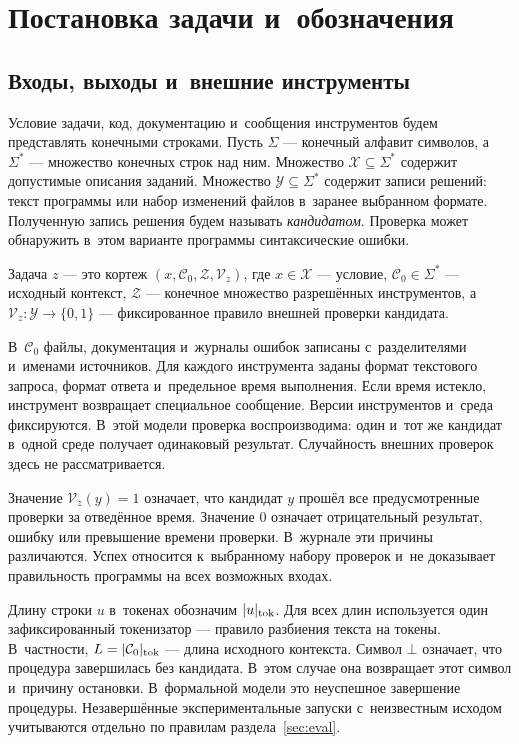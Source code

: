 \section{Постановка задачи и~обозначения}\label{sec:problem}
\subsection{Входы, выходы и~внешние инструменты}
Условие задачи, код, документацию и~сообщения инструментов будем представлять конечными строками. Пусть $\Sigma$ --- конечный алфавит символов, а~$\Sigma^*$ --- множество конечных строк над ним. Множество $\mathcal{X}\subseteq\Sigma^*$ содержит допустимые описания заданий. Множество $\mathcal{Y}\subseteq\Sigma^*$ содержит записи решений: текст программы или набор изменений файлов в~заранее выбранном формате. Полученную запись решения будем называть \emph{кандидатом}. Проверка может обнаружить в~этом варианте программы синтаксические ошибки.

\begin{definition}
Задача $z$ --- это кортеж $(x,\mathcal{C}_0,\mathcal{Z},\mathcal{V}_z)$, где $x\in\mathcal{X}$ --- условие, $\mathcal{C}_0\in\Sigma^*$ --- исходный контекст, $\mathcal{Z}$ --- конечное множество разрешённых инструментов, а~$\mathcal{V}_z:\mathcal{Y}\to\{0,1\}$ --- фиксированное правило внешней проверки кандидата.
\end{definition}

В~$\mathcal{C}_0$ файлы, документация и~журналы ошибок записаны с~разделителями и~именами источников. Для каждого инструмента заданы формат текстового запроса, формат ответа и~предельное время выполнения. Если время истекло, инструмент возвращает специальное сообщение. Версии инструментов и~среда фиксируются. В~этой модели проверка воспроизводима: один и~тот же кандидат в~одной среде получает одинаковый результат. Случайность внешних проверок здесь не рассматривается.

Значение $\mathcal{V}_z(y)=1$ означает, что кандидат $y$ прошёл все предусмотренные проверки за отведённое время. Значение $0$ означает отрицательный результат, ошибку или превышение времени проверки. В~журнале эти причины различаются. Успех относится к~выбранному набору проверок и~не доказывает правильность программы на всех возможных входах.

Длину строки $u$ в~токенах обозначим $\lvert u\rvert_{\mathrm{tok}}$. Для всех длин используется один зафиксированный токенизатор --- правило разбиения текста на токены. В~частности, $L=\lvert\mathcal{C}_0\rvert_{\mathrm{tok}}$ --- длина исходного контекста. Символ $\bot$ означает, что процедура завершилась без кандидата. В~этом случае она возвращает этот символ и~причину остановки. В~формальной модели это неуспешное завершение процедуры. Незавершённые экспериментальные запуски с~неизвестным исходом учитываются отдельно по правилам раздела~\ref{sec:eval}.


